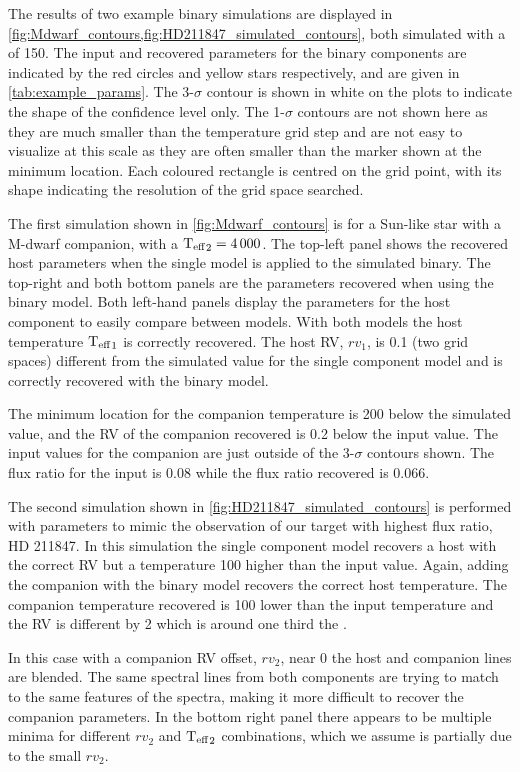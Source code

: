 The results of two example binary simulations are displayed in \cref{fig:Mdwarf_contours,fig:HD211847_simulated_contours}, both simulated with a \snr{} of 150.
The input and recovered parameters for the binary components are indicated by the red circles and yellow stars respectively, and are given in \cref{tab:example_params}.
The 3-\(\sigma\) contour is shown in white on the plots to indicate the shape of the confidence level only.
The 1-\(\sigma\) contours are not shown here as they are much smaller than the temperature grid step and are not easy to visualize at this scale as they are often smaller than the marker shown at the minimum location.
Each coloured rectangle is centred on the grid point, with its shape indicating the resolution of the grid space searched.

The first simulation shown in \cref{fig:Mdwarf_contours} is for a Sun-like star with a M-dwarf companion, with a \({\textrm{T}_{\mathrm{eff}}}_{2} =4\,000\)\K{}.
The top-left panel shows the recovered host parameters when the single model is applied to the simulated binary.
The top-right and both bottom panels are the parameters recovered when using the binary model.
Both left-hand panels display the parameters for the host component to easily compare between models.
With both models the host temperature \({\textrm{T}_{\mathrm{eff}}}_{1}\) is correctly recovered.
The host {RV}, \({rv}_1\), is 0.1\kmps{} (two grid spaces) different from the simulated value for the single component model and is correctly recovered with the binary model.

The minimum \textchisquared{} location for the companion temperature is 200\K{} below the simulated value, and the {RV} of the companion recovered is 0.2\kmps{} below the input value.
The input values for the companion are just outside of the 3-\(\sigma\) contours shown.
The flux ratio for the input is 0.08 while the flux ratio recovered is 0.066.

The second simulation shown in \cref{fig:HD211847_simulated_contours} is performed with parameters to mimic the observation of our target with highest flux ratio, {HD 211847}.
In this simulation the single component model recovers a host with the correct {RV} but a temperature 100\K{} higher than the input value.
Again, adding the companion with the binary model recovers the correct host temperature.
The companion temperature recovered is 100\K{} lower than the input temperature and the {RV} is different by 2\kmps{} which is around one third the {\fwhm}.

In this case with a companion {RV} offset, \({rv}_2\), near 0\kmps{} the host and companion lines are blended.
The same spectral lines from both components are trying to match to the same features of the spectra, making it more difficult to recover the companion parameters.
In the bottom right panel there appears to be multiple minima for different \({rv}_2\) and \({\textrm{T}_{\mathrm{eff}}}_{2}\) combinations, which we assume is partially due to the small \({rv}_2\).

